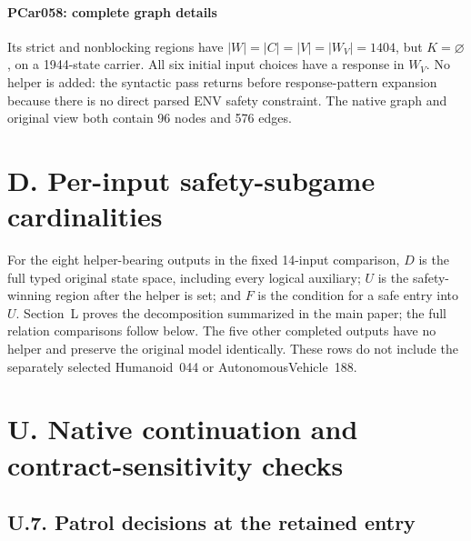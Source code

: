 \documentclass[11pt]{article}
\begin{document}
\paragraph{PCar058: complete graph details}
Its strict and nonblocking regions have
$|W|=|C|=|V|=|W_V|=1404$, but $K=\varnothing$, on a 1944-state carrier.
All six initial input choices have a response in $W_V$.
No helper is added: the syntactic pass returns before response-pattern
expansion because there is no direct parsed ENV safety constraint.
The native graph and original view both contain 96 nodes and 576 edges.

\section*{D. Per-input safety-subgame cardinalities}
For the eight helper-bearing outputs in the fixed 14-input comparison,
$D$ is the full typed original state space, including every logical
auxiliary; $U$ is the safety-winning region after the helper is set;
and $F$ is the condition for a safe entry into $U$.
Section~L proves the decomposition summarized in the main paper;
the full relation comparisons follow below. The five other completed outputs have no
helper and preserve the original model identically. These rows do
not include the separately selected Humanoid~044 or AutonomousVehicle~188.

















\section*{U. Native continuation and contract-sensitivity checks}






\clearpage
\subsection*{U.7. Patrol decisions at the retained entry}

\clearpage


\end{document}
